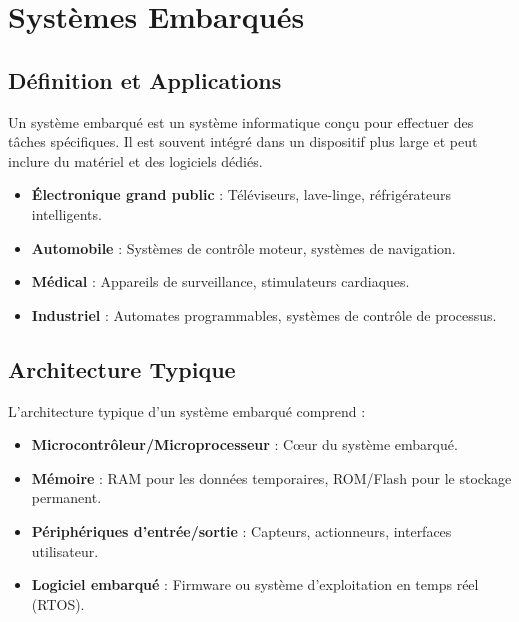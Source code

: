 \documentclass[10pt,a4paper]{article}
\begin{document}

\section*{Systèmes Embarqués}

\subsection*{Définition et Applications}

Un système embarqué est un système informatique conçu pour effectuer des tâches spécifiques. Il est souvent intégré dans un dispositif plus large et peut inclure du matériel et des logiciels dédiés.

\begin{itemize}
    \item \textbf{Électronique grand public} : Téléviseurs, lave-linge, réfrigérateurs intelligents.
    \item \textbf{Automobile} : Systèmes de contrôle moteur, systèmes de navigation.
    \item \textbf{Médical} : Appareils de surveillance, stimulateurs cardiaques.
    \item \textbf{Industriel} : Automates programmables, systèmes de contrôle de processus.
\end{itemize}


\subsection*{Architecture Typique}

L'architecture typique d'un système embarqué comprend :
\begin{itemize}
    \item \textbf{Microcontrôleur/Microprocesseur} : Cœur du système embarqué.
    \item \textbf{Mémoire} : RAM pour les données temporaires, ROM/Flash pour le stockage permanent.
    \item \textbf{Périphériques d'entrée/sortie} : Capteurs, actionneurs, interfaces utilisateur.
    \item \textbf{Logiciel embarqué} : Firmware ou système d'exploitation en temps réel (RTOS).
\end{itemize}
\end{document}
